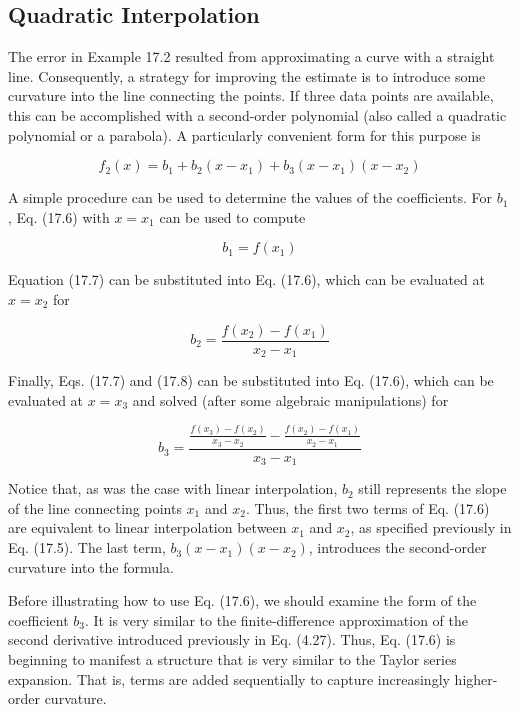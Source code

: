 \documentclass[../main.tex]{subfiles}
\begin{document}
\label{cha:cha_P_17_2_2}
\subsection{Quadratic Interpolation}

\noindent The error in Example 17.2 resulted from approximating a curve with a straight line. Consequently, a strategy for improving the estimate is to introduce some curvature into the line
connecting the points. If three data points are available, this can be accomplished with a
second-order polynomial (also called a quadratic polynomial or a parabola). A particularly
convenient form for this purpose is

\begin{equation}
	\tag{17.6}
	f_2(x) = b_1 + b_2 (x - x_1) + b_3 (x-x_1) (x - x_2)
\end{equation}

A simple procedure can be used to determine the values of the coefficients. For $b_1$,
Eq. (17.6) with $x = x_1$ can be used to compute

\begin{equation}
	\tag{17.7}
	b_1 = f(x_1)
\end{equation}

\noindent Equation (17.7) can be substituted into Eq. (17.6), which can be evaluated at $x = x_2$ for

\begin{equation}
	\tag{17.8}
	b_2 = \frac{f(x_2) - f(x_1)}{x_2 - x_1}
\end{equation}

\noindent Finally, Eqs. (17.7) and (17.8) can be substituted into Eq. (17.6), which can be evaluated at
$x = x_3$ and solved (after some algebraic manipulations) for

\begin{equation}
	\tag{17.9}
	b_3 = \frac{
		\frac{f(x_3) - f(x_2)}{x_3 - x_2} - \frac{f(x_2) - f(x_1)}{x_2 - x_1}
	}{x_3 - x_1}
\end{equation}

Notice that, as was the case with linear interpolation, $b_2$ still represents the slope of the
line connecting points $x_1$ and $x_2$. Thus, the first two terms of Eq. (17.6) are equivalent to
linear interpolation between $x_1$ and $x_2$, as specified previously in Eq. (17.5). The last term,
$b_3 (x - x_1 )(x - x_2)$, introduces the second-order curvature into the formula.

Before illustrating how to use Eq. (17.6), we should examine the form of the coefficient $b_3$. It is very similar to the finite-difference approximation of the second derivative
introduced previously in Eq. (4.27). Thus, Eq. (17.6) is beginning to manifest a structure
that is very similar to the Taylor series expansion. That is, terms are added sequentially to
capture increasingly higher-order curvature.
\end{document}
